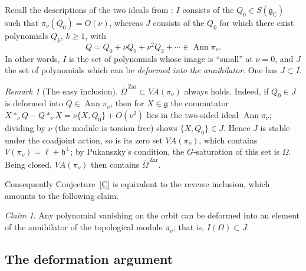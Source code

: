 \documentclass[11pt]{amsart}
\theoremstyle{plain}
\theoremstyle{definition}
\theoremstyle{remark}
\newtheorem{rmk}[thm]{Remark}
\newtheorem{Claim}[thm]{Claim}
\newcommand{\g}{\mathfrak g}
\newcommand{\h}{\mathfrak h}
\newcommand{\CC}{\mathbb C}
\newcommand{\Ann}{\operatorname{Ann}}
\newcommand{\VA}{V\!A}
\newcommand{\clos}[1]{\overline{#1}^{\,\mathrm{Zar}}}
\begin{document}
	Recall the descriptions of the two ideals from \cite{BDM05}: $I$ consists of the $Q_0\in S(\g_\CC)$ such that $\pi_\nu(Q_0)=O(\nu)$, whereas $J$ consists of the $Q_0$ for which there exist polynomials $Q_k$, $k\ge1$, with
	\[
	Q=Q_0+\nu Q_1+\nu^2Q_2+\cdots\in\Ann\pi_\nu .
	\]
	In other words, $I$ is the set of polynomials whose image is ``small'' at $\nu=0$, and $J$ the set of polynomials which can be \emph{deformed into the annihilator}. One has $J\subset I$.
	
	\begin{rmk}[The easy inclusion]\label{easy}
		$\clos{\Omega}\subset\VA(\pi_\nu)$ always holds. Indeed, if $Q_0\in J$ is deformed into $Q\in\Ann\pi_\nu$, then for $X\in\g$ the commutator $X*_\nu Q-Q*_\nu X=\nu\{X,Q_0\}+O(\nu^2)$ lies in the two-sided ideal $\Ann\pi_\nu$; dividing by $\nu$ (the module is torsion free) shows $\{X,Q_0\}\in J$. Hence $J$ is stable under the coadjoint action, so is its zero set $\VA(\pi_\nu)$, which contains $V(\pi_\nu)=\ell+\h^\perp$; by Pukanszky's condition, the $G$-saturation of this set is $\Omega$. Being closed, $\VA(\pi_\nu)$ then contains $\clos\Omega$.
	\end{rmk}
	
	Consequently Conjecture~\ref{C} is equivalent to the reverse inclusion, which amounts to the following claim.
	\begin{Claim}\label{Cbis}
		Any polynomial vanishing on the orbit can be deformed into an element of the annihilator of the topological module $\pi_\nu$; that is, $I(\Omega)\subset J$.
	\end{Claim}
	
	\subsection{The deformation argument}
	
\end{document}
